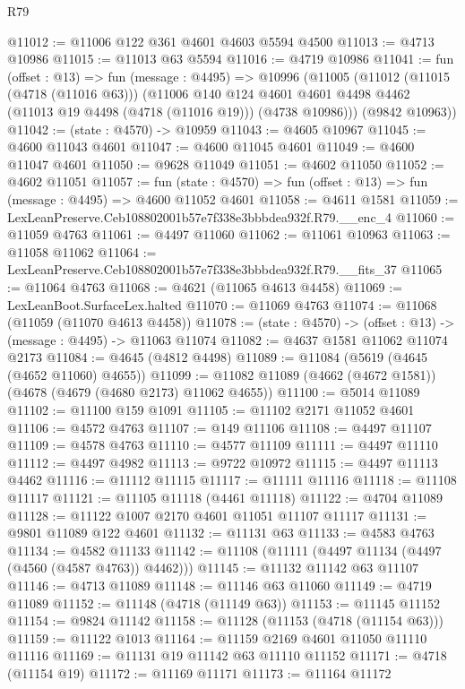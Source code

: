 \begin{lexlean}{R79}
\begin{coremodule}
@11012 := @11006 @122 @361 @4601 @4603 @5594 @4500
@11013 := @4713 @10986
@11015 := @11013 @63 @5594
@11016 := @4719 @10986
@11041 := fun (offset : @13) =>
  fun (message : @4495) =>
  @10996
    (@11005
      (@11012
        (@11015 (@4718 (@11016 @63)))
        (@11006
          @140
          @124
          @4601
          @4601
          @4498
          @4462
          (@11013 @19 @4498 (@4718 (@11016 @19)))
          (@4738 @10986)))
      (@9842 @10963))
@11042 := (state : @4570) -> @10959
@11043 := @4605 @10967
@11045 := @4600 @11043 @4601
@11047 := @4600 @11045 @4601
@11049 := @4600 @11047 @4601
@11050 := @9628 @11049
@11051 := @4602 @11050
@11052 := @4602 @11051
@11057 := fun (state : @4570) => fun (offset : @13) => fun (message : @4495) => @4600 @11052 @4601
@11058 := @4611 @1581
@11059 := LexLeanPreserve.Ceb108802001b57e7f338e3bbbdea932f.R79.__enc_4
@11060 := @11059 @4763
@11061 := @4497 @11060
@11062 := @11061 @10963
@11063 := @11058 @11062
@11064 := LexLeanPreserve.Ceb108802001b57e7f338e3bbbdea932f.R79.__fits_37
@11065 := @11064 @4763
@11068 := @4621 (@11065 @4613 @4458)
@11069 := LexLeanBoot.SurfaceLex.halted
@11070 := @11069 @4763
@11074 := @11068 (@11059 (@11070 @4613 @4458))
@11078 := (state : @4570) -> (offset : @13) -> (message : @4495) -> @11063 @11074
@11082 := @4637 @1581 @11062 @11074 @2173
@11084 := @4645 (@4812 @4498)
@11089 := @11084 (@5619 (@4645 (@4652 @11060) @4655))
@11099 := @11082 @11089 (@4662 (@4672 @1581)) (@4678 (@4679 (@4680 @2173) @11062 @4655))
@11100 := @5014 @11089
@11102 := @11100 @159 @1091
@11105 := @11102 @2171 @11052 @4601
@11106 := @4572 @4763
@11107 := @149 @11106
@11108 := @4497 @11107
@11109 := @4578 @4763
@11110 := @4577 @11109
@11111 := @4497 @11110
@11112 := @4497 @4982
@11113 := @9722 @10972
@11115 := @4497 @11113 @4462
@11116 := @11112 @11115
@11117 := @11111 @11116
@11118 := @11108 @11117
@11121 := @11105 @11118 (@4461 @11118)
@11122 := @4704 @11089
@11128 := @11122 @1007 @2170 @4601 @11051 @11107 @11117
@11131 := @9801 @11089 @122 @4601
@11132 := @11131 @63
@11133 := @4583 @4763
@11134 := @4582 @11133
@11142 := @11108 (@11111 (@4497 @11134 (@4497 (@4560 (@4587 @4763)) @4462)))
@11145 := @11132 @11142 @63 @11107
@11146 := @4713 @11089
@11148 := @11146 @63 @11060
@11149 := @4719 @11089
@11152 := @11148 (@4718 (@11149 @63))
@11153 := @11145 @11152
@11154 := @9824 @11142
@11158 := @11128 (@11153 (@4718 (@11154 @63)))
@11159 := @11122 @1013
@11164 := @11159 @2169 @4601 @11050 @11110 @11116
@11169 := @11131 @19 @11142 @63 @11110 @11152
@11171 := @4718 (@11154 @19)
@11172 := @11169 @11171
@11173 := @11164 @11172

\end{coremodule}
\end{lexlean}
